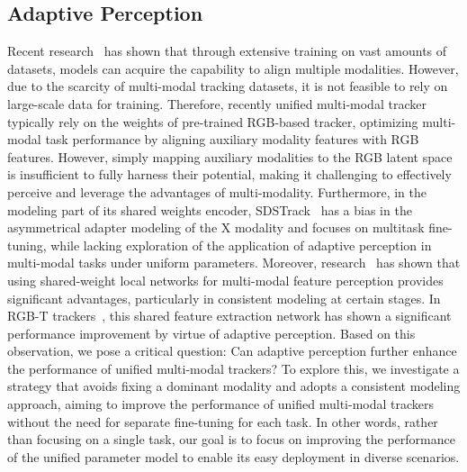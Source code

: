 \subsection{Adaptive Perception}
Recent research~\cite{imagebind,mutex,unified,clip} has shown that through extensive training on vast amounts of datasets, models can acquire the capability to align multiple modalities. However, due to the scarcity of multi-modal tracking datasets, it is not feasible to rely on large-scale data for training.
Therefore, recently unified multi-modal tracker~\cite{vipt,untrack,onetracker,sdstrack} typically rely on the weights of pre-trained RGB-based tracker, optimizing multi-modal task performance by aligning auxiliary modality features with RGB features. However, simply mapping auxiliary modalities to the RGB latent space is insufficient to fully harness their potential, making it challenging to effectively perceive and leverage the advantages of multi-modality. Furthermore, in the modeling part of its shared weights encoder, SDSTrack~\cite{sdstrack} has a bias in the asymmetrical adapter modeling of the X modality and focuses on multitask fine-tuning, while lacking exploration of the application of adaptive perception in multi-modal tasks under uniform parameters. Moreover, research~\cite{learning_li,siamese_av,unified_av}  has shown that using shared-weight local networks for multi-modal feature perception provides significant advantages, particularly in consistent modeling at certain stages. In RGB-T trackers~\cite{tbsi,bat}, this shared feature extraction network has shown a significant performance improvement by virtue of adaptive perception. Based on this observation, we pose a critical question: Can adaptive perception further enhance the performance of unified multi-modal trackers? To explore this, we investigate a strategy that avoids fixing a dominant modality and adopts a consistent modeling approach, aiming to improve the performance of unified multi-modal trackers without the need for separate fine-tuning for each task. In other words, rather than focusing on a single task, our goal is to focus on improving the performance of the unified parameter model to enable its easy deployment in diverse scenarios.

